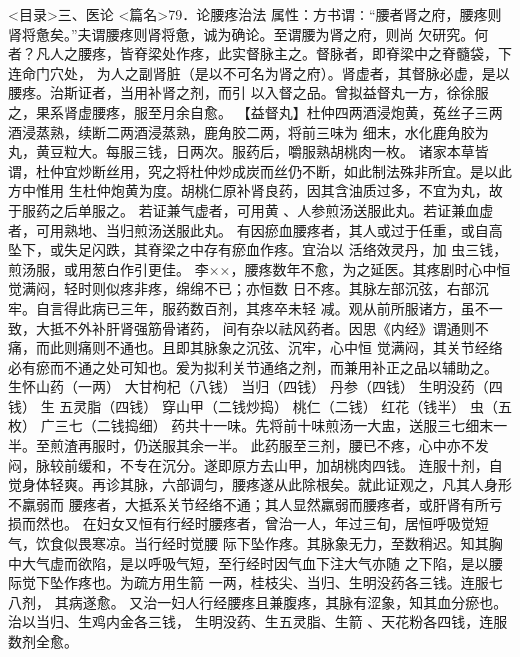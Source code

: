 \documentclass[a4paper,12pt,UTF8,twoside]{ctexbook}
\begin{document}
<目录>三、医论
<篇名>79．论腰疼治法
属性：方书谓∶“腰者肾之府，腰疼则肾将惫矣。”夫谓腰疼则肾将惫，诚为确论。至谓腰为肾之府，则尚 
欠研究。何者？凡人之腰疼，皆脊梁处作疼，此实督脉主之。督脉者，即脊梁中之脊髓袋，下连命门穴处， 
为人之副肾脏（是以不可名为肾之府）。肾虚者，其督脉必虚，是以腰疼。治斯证者，当用补肾之剂，而引 
以入督之品。曾拟益督丸一方，徐徐服之，果系肾虚腰疼，服至月余自愈。 
【益督丸】杜仲四两酒浸炮黄，菟丝子三两酒浸蒸熟，续断二两酒浸蒸熟，鹿角胶二两，将前三味为 
细末，水化鹿角胶为丸，黄豆粒大。每服三钱，日两次。服药后，嚼服熟胡桃肉一枚。 
诸家本草皆谓，杜仲宜炒断丝用，究之将杜仲炒成炭而丝仍不断，如此制法殊非所宜。是以此方中惟用 
生杜仲炮黄为度。胡桃仁原补肾良药，因其含油质过多，不宜为丸，故于服药之后单服之。 
若证兼气虚者，可用黄 、人参煎汤送服此丸。若证兼血虚者，可用熟地、当归煎汤送服此丸。 
有因瘀血腰疼者，其人或过于任重，或自高坠下，或失足闪跌，其脊梁之中存有瘀血作疼。宜治以 
活络效灵丹，加 虫三钱，煎汤服，或用葱白作引更佳。 
李××，腰疼数年不愈，为之延医。其疼剧时心中恒觉满闷，轻时则似疼非疼，绵绵不已；亦恒数 
日不疼。其脉左部沉弦，右部沉牢。自言得此病已三年，服药数百剂，其疼卒未轻 
减。观从前所服诸方，虽不一致，大抵不外补肝肾强筋骨诸药， 
间有杂以祛风药者。因思《内经》谓通则不痛，而此则痛则不通也。且即其脉象之沉弦、沉牢，心中恒 
觉满闷，其关节经络必有瘀而不通之处可知也。爰为拟利关节通络之剂，而兼用补正之品以辅助之。 
生怀山药（一两） 大甘枸杞（八钱） 当归（四钱） 丹参（四钱） 生明没药（四钱） 生 
五灵脂（四钱） 穿山甲（二钱炒捣） 桃仁（二钱） 红花（钱半） 虫（五枚） 广三七（二钱捣细） 
药共十一味。先将前十味煎汤一大盅，送服三七细末一半。至煎渣再服时，仍送服其余一半。 
此药服至三剂，腰已不疼，心中亦不发闷，脉较前缓和，不专在沉分。遂即原方去山甲，加胡桃肉四钱。 
连服十剂，自觉身体轻爽。再诊其脉，六部调匀，腰疼遂从此除根矣。就此证观之，凡其人身形不羸弱而 
腰疼者，大抵系关节经络不通；其人显然羸弱而腰疼者，或肝肾有所亏损而然也。 
在妇女又恒有行经时腰疼者，曾治一人，年过三旬，居恒呼吸觉短气，饮食似畏寒凉。当行经时觉腰 
际下坠作疼。其脉象无力，至数稍迟。知其胸中大气虚而欲陷，是以呼吸气短，至行经时因气血下注大气亦随 
之下陷，是以腰际觉下坠作疼也。为疏方用生箭 一两，桂枝尖、当归、生明没药各三钱。连服七八剂， 
其病遂愈。 
又治一妇人行经腰疼且兼腹疼，其脉有涩象，知其血分瘀也。治以当归、生鸡内金各三钱， 
生明没药、生五灵脂、生箭 、天花粉各四钱，连服数剂全愈。 
\end{document}
